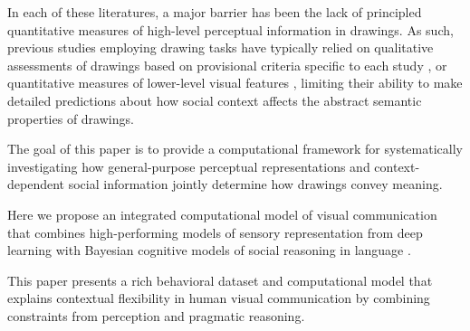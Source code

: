 \documentclass[9pt,twocolumn,twoside]{pnas-new}
\begin{document}
In each of these literatures, a major barrier has been the lack of principled quantitative measures of high-level perceptual information in drawings. As such, previous studies employing drawing tasks have typically relied on qualitative assessments of drawings based on provisional criteria specific to each study \cite{goodenough1963goodenough}, or quantitative measures of lower-level visual features \cite{Garrod:2007wk,perdreau2014drawing}, limiting their ability to make detailed predictions about how social context affects the abstract semantic properties of drawings.


The goal of this paper is to provide a computational framework for systematically investigating how general-purpose perceptual representations and context-dependent social information jointly determine how drawings convey meaning. 








Here we propose an integrated computational model of visual communication that combines high-performing models of sensory representation from deep learning with Bayesian cognitive models of social reasoning in language \cite{goodman2016pragmatic}.


This paper presents a rich behavioral dataset and computational model that explains contextual flexibility in human visual communication by combining constraints from perception and pragmatic reasoning.
\end{document}
